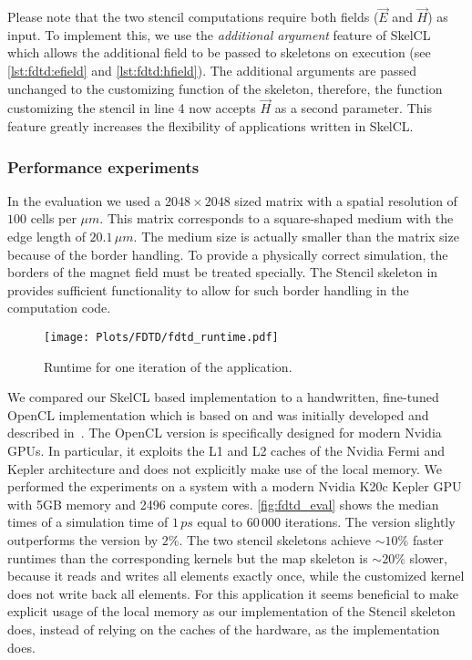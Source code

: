 Please note that the two stencil computations require both fields ($\vec{E}$ and $\vec{H}$) as input.
To implement this, we use the \emph{additional argument} feature of SkelCL which allows the additional field to be passed to skeletons on execution (see \autoref{lst:fdtd:efield} and \autoref{lst:fdtd:hfield}).
The additional arguments are passed unchanged to the customizing function of the skeleton, therefore, the function customizing the stencil in line 4 now accepts $\vec{H}$ as a second parameter.
This feature greatly increases the flexibility of applications written in SkelCL.


\subsubsection*{Performance experiments}

In the evaluation we used a $2048 \times 2048$ sized matrix with a spatial resolution of $100$ cells per $\mu m$.
This matrix corresponds to a square-shaped medium with the edge length of $20.1\,\mu m$.
The medium size is actually smaller than the matrix size because of the border handling.
To provide a physically correct simulation, the borders of the magnet field must be treated specially.
The Stencil skeleton in \SkelCL provides sufficient functionality to allow for such border handling in the computation code.

\begin{figure}[t]
    \centering
    \texttt{[image: Plots/FDTD/fdtd\_runtime.pdf]}
    \caption{\small Runtime for one iteration of the \FDTD application.}
    \label{fig:fdtd_eval}
\end{figure}

We compared our SkelCL based implementation to a handwritten, fine-tuned OpenCL implementation which is based on \cite{Knitter2013} and was initially developed and described in~\cite{Haidl2011}.
The OpenCL version is specifically designed for modern Nvidia GPUs.
In particular, it exploits the L1 and L2 caches of the Nvidia Fermi and Kepler architecture and does not explicitly make use of the local memory.
We performed the experiments on a system with a modern Nvidia K20c Kepler GPU with 5GB memory and 2496 compute cores.
\autoref{fig:fdtd_eval} shows the median times of a simulation time of $1\,ps$ equal to $60\, 000$ iterations.
The \SkelCL version slightly outperforms the \OpenCL version by $2\%$.
The two stencil skeletons achieve ${\sim}10\%$ faster runtimes than the corresponding \OpenCL kernels but the map skeleton is ${\sim}20\%$ slower, because it reads and writes all elements exactly once, while the customized \OpenCL kernel does not write back all elements.
For this application it seems beneficial to make explicit usage of the local memory as our implementation of the Stencil skeleton does, instead of relying on the caches of the hardware, as the \OpenCL implementation does.

